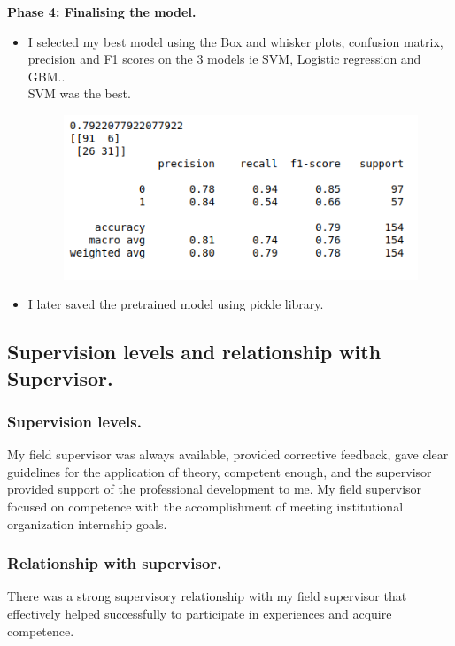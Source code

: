 \documentclass[11pt]{article}
\begin{document}
\newpage
\textbf{Phase 4: Finalising the model.}
\begin{itemize}
	\item I selected my best model using the Box and whisker plots, confusion matrix, precision and F1 scores on the 3 models ie SVM, Logistic regression and GBM..\\

	SVM was the best.\\
	\begin{figure}[h]
		\centerline{\small 
			\includegraphics[height=0.2\textheight]  {y8}}
	\end{figure}
	
	\item I later saved the pretrained model using pickle library.\\
	
	
	
\end{itemize}




\newpage
\subsection{Supervision levels and relationship with Supervisor.}
\subsubsection{Supervision levels.}
My field supervisor was always available, provided corrective feedback, gave clear guidelines for
the application of theory, competent enough, and the supervisor provided support of the
professional development to me.
My field supervisor focused on competence with the accomplishment of meeting institutional
organization internship goals.\\

\subsubsection{Relationship with supervisor.}
There was a strong supervisory relationship with my field supervisor that effectively helped
successfully to participate in experiences and acquire competence.\\
\end{document}
